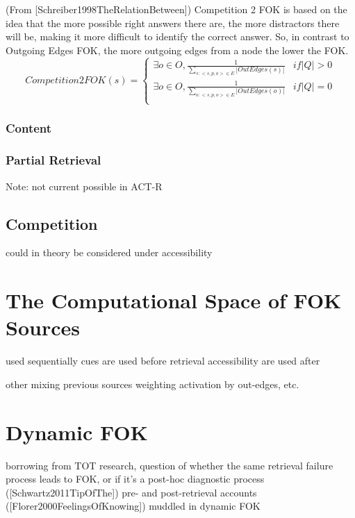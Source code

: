 \documentclass[10pt,letterpaper]{article}
\begin{document}
(From [Schreiber1998TheRelationBetween])
Competition 2 FOK is based on the idea that the more possible right answers there are, the more distractors there will be, making it more difficult to identify the correct answer. So, in contrast to Outgoing Edges FOK, the more outgoing edges from a node the lower the FOK.
\noindent$$Competition2FOK(s) =
\begin{cases}
    \exists o{\in}O, \frac{1}{\sum\limits_{s: <s, p, o> \in E} {|OutEdges(s)|}} & {if |Q| > 0} \\
    \exists o{\in}O, \frac{1}{\sum\limits_{o: <s, p, o> \in E} {|OutEdges(o)|}} & {if |Q| = 0} \\
\end{cases}
$$

\subsubsection{Content}

\subsubsection{Partial Retrieval}

Note: not current possible in ACT-R

\subsection{Competition}

could in theory be considered under accessibility

\section{The Computational Space of FOK Sources}

used sequentially \cite{Koriat2001TheCombinedContributions}
cues are used before retrieval
accessibility are used after

other mixing previous sources
    weighting activation by out-edges, etc.

\section{Dynamic FOK}

borrowing from TOT research, question of whether the same retrieval failure process leads to FOK, or if it's a post-hoc diagnostic process ([Schwartz2011TipOfThe])
pre- and post-retrieval accounts ([Florer2000FeelingsOfKnowing]) muddled in dynamic FOK
\end{document}

